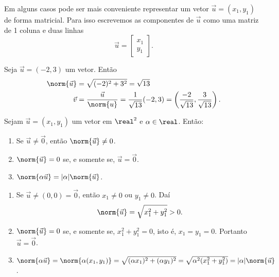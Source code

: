 Em alguns casos pode ser mais conveniente representar um vetor $\vec{u} = (x_1, y_1)$ de forma matricial. Para isso escrevemos as componentes de $\vec{u}$ como uma matriz de 1 coluna e duas linhas
\[
  \vec{u} = \begin{bmatrix}
    x_1\\y_1
  \end{bmatrix}.
\]


\begin{exemplos}
  Seja $\vec{u} = (-2,3)$ um vetor. Então
  \begin{align*}
    \norm{\vec{u}} &= \sqrt{(-2)^2 + 3^2} = \sqrt{13}\\
    \vec{v} &= \dfrac{\vec{u}}{\norm{u}} = \dfrac{1}{\sqrt{13}}(-2,3) = \left(\dfrac{-2}{\sqrt{13}}, \dfrac{3}{\sqrt{13}}\right).
  \end{align*}
\end{exemplos}





\begin{proposicao}
  Sejam $\vec{u} = (x_1, y_1)$ um vetor em $\real^2$ e $\alpha \in \real$. Então:
  \begin{enumerate}[label=({\roman*})]
    \item Se $\vec{u} \ne \vec{0}$, então $\norm{\vec{u}} \ne 0$.
    \item $\norm{\vec{u}} = 0$ se, e somente se, $\vec{u} = \vec{0}$.
    \item $\norm{\alpha\vec{u}} = |\alpha|\norm{\vec{u}}$.
  \end{enumerate}
\end{proposicao}
\begin{prova}
  \begin{enumerate}[label=({\roman*})]
    \item  Se $\vec{u} \ne (0,0) = \vec{0}$, então $x_1 \ne 0$ ou $y_1 \ne 0$. Daí
    \[
      \norm{\vec{u}} = \sqrt{x_1^2 + y_1^2} > 0.
    \]
    \item $\norm{\vec{u}} = 0$ se, e somente se, $x_1^2 + y_1^2 = 0$, isto é, $x_1 = y_1 = 0$. Portanto $\vec{u} = \vec{0}$.
    \item $\norm{\alpha\vec{u}} = \norm{\alpha(x_1, y_1)} = \sqrt{(\alpha x_1)^2 + (\alpha y_1)^2} = \sqrt{\alpha^2(x_1^2 + y_1^2)} = |\alpha|\norm{\vec{u}}$.
  \end{enumerate}
\end{prova}

